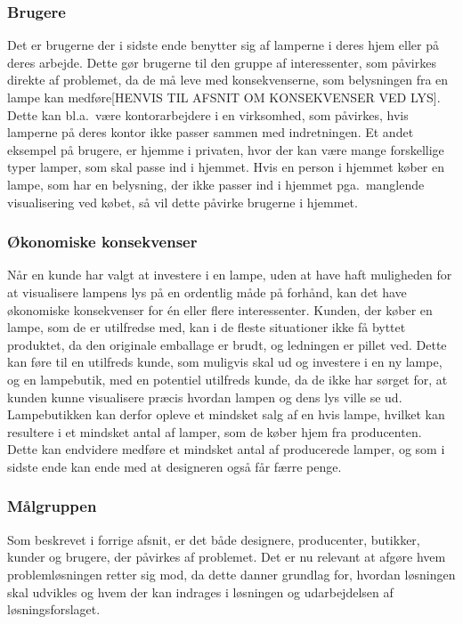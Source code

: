 \subsubsection{Brugere}
Det er brugerne der i sidste ende benytter sig af lamperne i deres hjem eller på deres arbejde. Dette gør brugerne til den gruppe af interessenter, som påvirkes direkte af problemet, da de må leve med konsekvenserne, som belysningen fra en lampe kan medføre[HENVIS TIL AFSNIT OM KONSEKVENSER VED LYS]. Dette kan bl.a.\ være kontorarbejdere i en virksomhed, som påvirkes, hvis lamperne på deres kontor ikke passer sammen med indretningen. Et andet eksempel på brugere, er hjemme i privaten, hvor der kan være mange forskellige typer lamper, som skal passe ind i hjemmet. Hvis en person i hjemmet køber en lampe, som har en belysning, der ikke passer ind i hjemmet pga.\ manglende visualisering ved købet, så vil dette påvirke brugerne i hjemmet. 

\subsubsection{Økonomiske konsekvenser}
Når en kunde har valgt at investere i en lampe, uden at have haft muligheden for at visualisere lampens lys på en ordentlig måde på forhånd, kan det have økonomiske konsekvenser for én eller flere interessenter. Kunden, der køber en lampe, som de er utilfredse med, kan i de fleste situationer ikke få byttet produktet, da den originale emballage er brudt, og ledningen er pillet ved. Dette kan føre til en utilfreds kunde, som muligvis skal ud og investere i en ny lampe, og en lampebutik, med en potentiel utilfreds kunde, da de ikke har sørget for, at kunden kunne visualisere præcis hvordan lampen og dens lys ville se ud. Lampebutikken kan derfor opleve et mindsket salg af en hvis lampe, hvilket kan resultere i et mindsket antal af lamper, som de køber hjem fra producenten. Dette kan endvidere medføre et mindsket antal af producerede lamper, og som i sidste ende kan ende med at designeren også får færre penge.

\subsubsection{Målgruppen}
Som beskrevet i forrige afsnit, er det både designere, producenter, butikker, kunder og brugere, der påvirkes af problemet. Det er nu relevant at afgøre hvem problemløsningen retter sig mod, da dette danner grundlag for, hvordan løsningen skal udvikles og hvem der kan indrages i løsningen og udarbejdelsen af løsningsforslaget.

